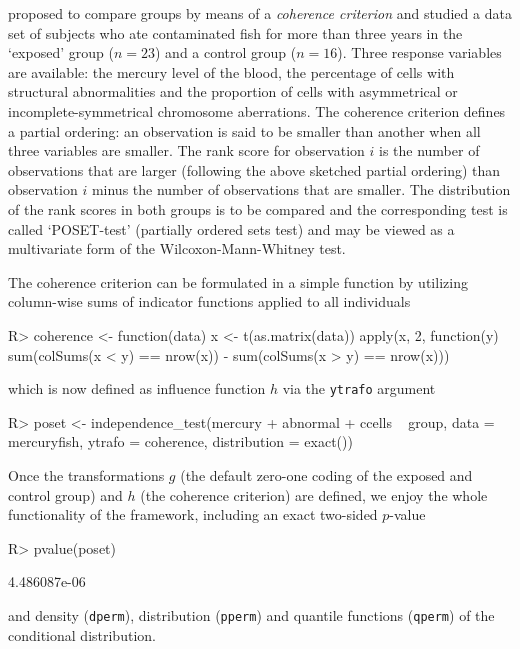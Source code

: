 \documentclass{article}
\newcommand{\Rcmd}[1]{\texttt{#1}}
\newenvironment{Schunk}{}{}
\begin{document}
\cite{Rosenbaum1994a} proposed to compare groups by means of a
\textit{coherence criterion} and studied a data set of subjects 
who ate contaminated fish for more than three years in
the `exposed' group ($n = 23$) and a control group ($n = 16$). 
Three response variables are
available: the mercury level of the blood, the percentage of cells with
structural abnormalities and the proportion of cells with asymmetrical or
incomplete-symmetrical chromosome aberrations.
The coherence criterion defines a partial ordering: 
an observation is said to be smaller than another when all three variables
are smaller. The rank score for observation $i$ is the number of
observations that are larger (following the above sketched partial ordering) 
than observation $i$ minus the number of
observations that are smaller. The
distribution of the rank scores in both groups is to be compared and
the corresponding test is called `POSET-test' (partially ordered
sets test) and may be viewed as a multivariate form of the
Wilcoxon-Mann-Whitney test.

The coherence criterion can be formulated in a simple function by utilizing 
column-wise sums of indicator functions applied to all individuals
\begin{Schunk}
\begin{Sinput}
R> coherence <- function(data) {
       x <- t(as.matrix(data))
       apply(x, 2, function(y) sum(colSums(x < 
           y) == nrow(x)) - sum(colSums(x > 
           y) == nrow(x)))
   }
\end{Sinput}
\end{Schunk}
which is now defined as influence function $h$ via the \Rcmd{ytrafo} argument
\begin{Schunk}
\begin{Sinput}
R> poset <- independence_test(mercury + 
       abnormal + ccells ~ group, data = mercuryfish, 
       ytrafo = coherence, distribution = exact())
\end{Sinput}
\end{Schunk}
Once the transformations $g$ (the default zero-one coding of the exposed and control
group) and $h$ (the coherence criterion) are defined, we enjoy the whole
functionality of the framework, including an exact two-sided $p$-value
\begin{Schunk}
\begin{Sinput}
R> pvalue(poset)
\end{Sinput}
\begin{Soutput}
[1] 4.486087e-06
\end{Soutput}
\end{Schunk}
and density (\Rcmd{dperm}), distribution (\Rcmd{pperm}) and quantile functions 
(\Rcmd{qperm}) of the conditional distribution. 
\end{document}

